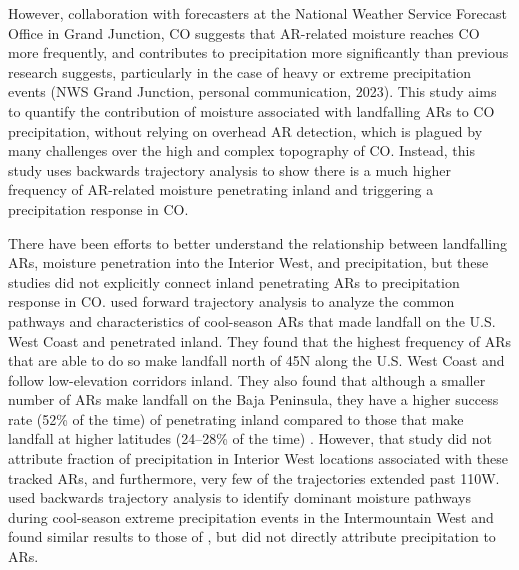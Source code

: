 \documentclass[draft]{agujournal2019}
\begin{document}
However, collaboration with forecasters at the National Weather Service Forecast Office in Grand Junction, CO suggests that AR-related moisture reaches CO more frequently, and contributes to precipitation more significantly than previous research suggests, particularly in the case of heavy or extreme precipitation events (NWS Grand Junction, personal communication, 2023). This study aims to quantify the contribution of moisture associated with landfalling ARs to CO precipitation, without relying on overhead AR detection, which is plagued by many challenges over the high and complex topography of CO. Instead, this study uses backwards trajectory analysis to show there is a much higher frequency of AR-related moisture penetrating inland and triggering a precipitation response in CO. 

There have been efforts to better understand the relationship between landfalling ARs, moisture penetration into the Interior West, and precipitation, but these studies did not explicitly connect inland penetrating ARs to precipitation response in CO.  used forward trajectory analysis to analyze the common pathways and characteristics of cool-season ARs that made landfall on the U.S. West Coast and penetrated inland. They found that the highest frequency of ARs that are able to do so make landfall north of 45\textdegree N along the U.S. West Coast and follow low-elevation corridors inland. They also found that although a smaller number of ARs make landfall on the Baja Peninsula, they have a higher success rate (52\% of the time) of penetrating inland compared to those that make landfall at higher latitudes (24--28\% of the time) \cite{Rutz2015}. However, that study did not attribute fraction of precipitation in Interior West locations associated with these tracked ARs, and furthermore, very few of the trajectories extended past 110\textdegree W.  used backwards trajectory analysis to identify dominant moisture pathways during cool-season extreme precipitation events in the Intermountain West and found similar results to those of , but did not directly attribute precipitation to ARs. 
\end{document}
